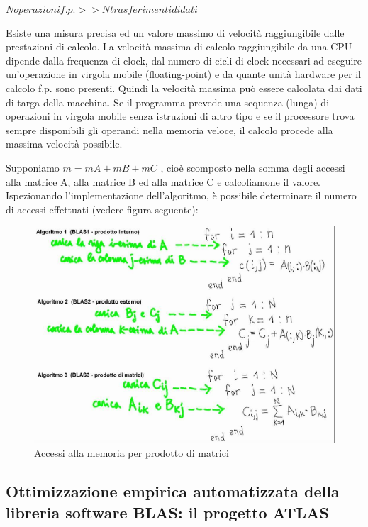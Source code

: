 \begin{center}

$Noperazioni f.p.  >>   Ntrasferimenti di dati$

\end{center}

Esiste una misura precisa ed un valore massimo di velocità raggiungibile dalle prestazioni di calcolo. La velocità massima di calcolo raggiungibile da una CPU dipende dalla frequenza di clock, dal numero di cicli di clock necessari ad eseguire un'operazione in virgola mobile (floating-point) e da quante unità hardware per il calcolo f.p. sono presenti. Quindi la velocità massima può essere calcolata dai dati di targa della macchina.
Se il programma prevede una sequenza (lunga) di operazioni in virgola mobile senza istruzioni di altro tipo e se il processore trova sempre disponibili gli operandi nella memoria veloce, il calcolo procede alla massima velocità possibile.

Supponiamo $m = mA + mB + mC$ , cioè scomposto nella somma degli accessi alla matrice A, alla matrice B ed alla matrice C  e calcoliamone il valore. Ispezionando l'implementazione dell'algoritmo, è possibile determinare il numero di accessi effettuati (vedere figura seguente):

\begin{figure}[ht!]
\centering
\includegraphics[width=130mm]{images/accessi_alla_memoria_per_prodotto_di_matrici.JPG}
\caption{Accessi alla memoria per prodotto di matrici}
\label{overflow}
\end{figure}

\subsection{Ottimizzazione empirica automatizzata della libreria software BLAS: il progetto ATLAS}

